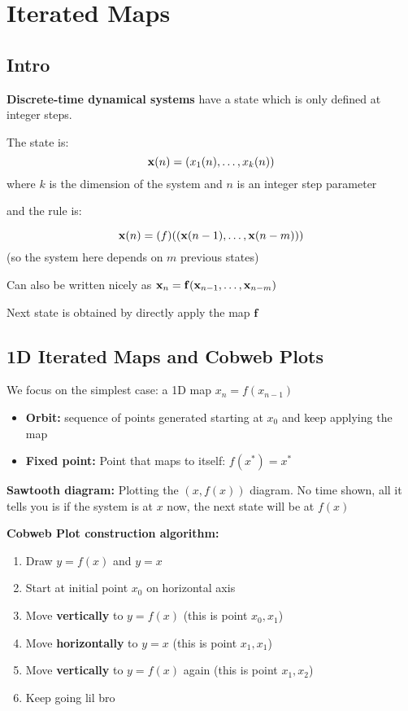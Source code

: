 \chapter*{Iterated Maps}

\section*{Intro}

\textbf{Discrete-time dynamical systems} have a state which is only 
defined at integer steps. 

The state is:
\[\mathbf{x}(n) = (x_1(n), \dots, x_k(n))\] 
where $k$ is the dimension of the system and $n$ is an integer step parameter

and the rule is:

\[\mathbf{x}(n) = \mathbf(f)((\mathbf{x}(n-1), \dots, \mathbf{x}(n-m)))\] (so the system here depends on 
$m$ previous states)

Can also be written nicely as $\mathbf{x}_n = \mathbf{f}(\mathbf{x}_{n-1}, \dots, \mathbf{x}_{n-m})$

Next state is obtained by directly apply the map $\mathbf{f}$

\section*{1D Iterated Maps and Cobweb Plots}

We focus on the simplest case: a 1D map $x_n = f(x_{n-1})$

\begin{itemize}
    \item \textbf{Orbit:} sequence of points generated starting at $x_0$
    and keep applying the map 
    \item \textbf{Fixed point:} Point that maps to itself: $f(x^*) = x^*$
\end{itemize}

\textbf{Sawtooth diagram:} Plotting the $(x, f(x))$ diagram. No time shown, 
all it tells you is if the system is at $x$ now, the next state will be at $f(x)$

\textbf{Cobweb Plot construction algorithm:}

\begin{enumerate}
    \item Draw $y=f(x)$ and $y=x$
    \item Start at initial point $x_0$ on horizontal axis 
    \item Move \textbf{vertically} to $y = f(x)$ (this is point $x_0, x_1$)
    \item Move \textbf{horizontally} to $y = x$ (this is point $x_1, x_1$)
    \item Move \textbf{vertically} to $y = f(x)$ again (this is point $x_1, x_2$)
    \item Keep going lil bro
\end{enumerate}


